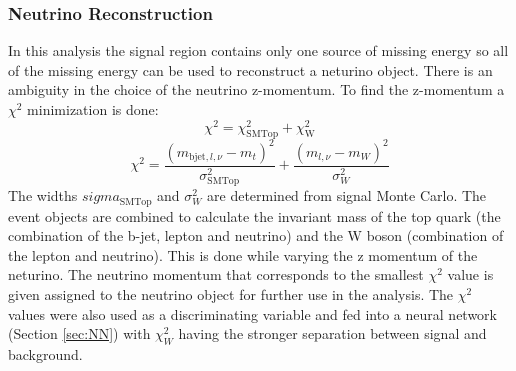 \subsubsection{Neutrino Reconstruction}
In this analysis the signal region contains only one source of missing energy so all of the missing energy can be used to reconstruct a neturino object.  There is an ambiguity in the choice of the neutrino z-momentum.  To find the z-momentum a $\chi^2$ minimization is done:
\[ \chi^2 = \chi_{\text{SMTop}}^2 + \chi_{\text{W}}^2 \]
\[ \chi^2 = \frac{(m_{\text{bjet},l,\nu}-m_t)^2}{\sigma_{\text{SMTop}}^2} + \frac{(m_{l,\nu}-m_W)^2}{\sigma_W^2} \]
The widths $sigma_{\text{SMTop}}$ and $\sigma_W^2$ are determined from signal Monte Carlo.  The event objects are combined to calculate the invariant mass of the top quark (the combination of the b-jet, lepton and neutrino) and the W boson (combination of the lepton and neutrino).  This is done while varying the z momentum of the neturino.  The neutrino momentum that corresponds to the smallest $\chi^2$ value is given assigned to the neutrino object for further use in the analysis.  The $\chi^2$ values were also used as a discriminating variable and fed into a neural network (Section \ref{sec:NN}) with $\chi_W^2$ having the stronger separation between signal and background. 








